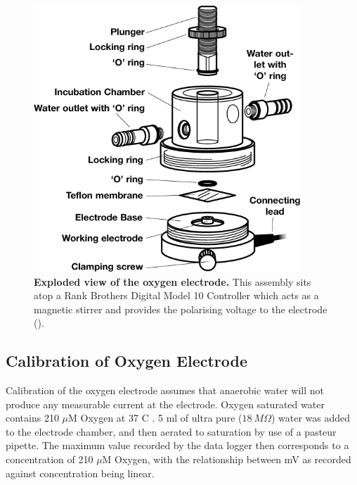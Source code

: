 \begin{figure}[tbp]
	\begin{center}
		\includegraphics[height=10cm]{02-materialsmethods/data/oxyexpp.png}
	\caption[Exploded view of the oxygen electrode]{{\bf Exploded view of the oxygen electrode.} This assembly sits atop a Rank Brothers Digital Model 10 Controller which acts as a magnetic stirrer and provides the polarising voltage to the electrode (\citet{Rank2012}).
	\label{fig:oxyexpp}}
	\end{center}
\end{figure}


\subsection{Calibration of Oxygen Electrode}
Calibration of the oxygen electrode assumes that anaerobic water will not produce any measurable current at the electrode. Oxygen saturated water contains 210 $\mu$M Oxygen at 37 \textdegree C \cite{YSI2012}. 5 ml of ultra pure ($18~M\Omega$) water was added to the electrode chamber, and then aerated to saturation by use of a pasteur pipette. The maximum value recorded by the data logger then corresponds to a concentration of 210 $\mu$M Oxygen, with the relationship between mV as recorded against concentration being linear.

